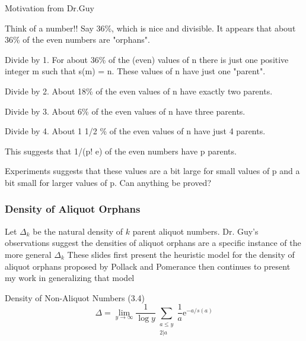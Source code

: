 \documentclass{beamer}
\begin{document}
\begin{frame}{Motivation from Dr.Guy}

\small{Think of a number!! Say 36\%, which is nice and divisible. It appears that about 36\% of the even numbers are "orphans". \linebreak

Divide by 1. For about 36\% of the (even) values of n there is just one positive integer m such that s(m) = n. These values of n have just one "parent". \linebreak

Divide by 2.  About 18\% of the even values of n have exactly two parents. \linebreak

Divide by 3. About 6\% of the even values of n have three parents. \linebreak

Divide by 4. About 1 1/2 \% of the even values of n have just 4 parents.  \linebreak

This suggests that 1/(p! e) of the even numbers have p parents.\linebreak

Experiments suggests that these values are a bit large for small values of p and a bit small for larger values of p. Can anything be proved?\\}
\end{frame}

\begin{frame}
\frametitle{Density of Aliquot Orphans}

Let $\Delta_k$ be the natural density of $k$ parent aliquot numbers.\linebreak \linebreak
Dr. Guy's observations suggest the densities of aliquot orphans are a specific instance of the more general $\Delta_k$ \linebreak\linebreak
These slides first present the heuristic model for the density of aliquot orphans proposed by Pollack and Pomerance \textcolor{blue}{\cite{pollPom}} then continues to present my work in generalizing that model
\begin{block}{Density of Non-Aliquot Numbers (3.4)}
$$\Delta = \lim_{y \to \infty}\frac{1}{\log y} \sum_{\substack{a\leq y \\ 2 | a}} \frac{1}{a}\text{e}^{-a/s(a)}$$
\end{block}

\end{frame}
\end{document}
